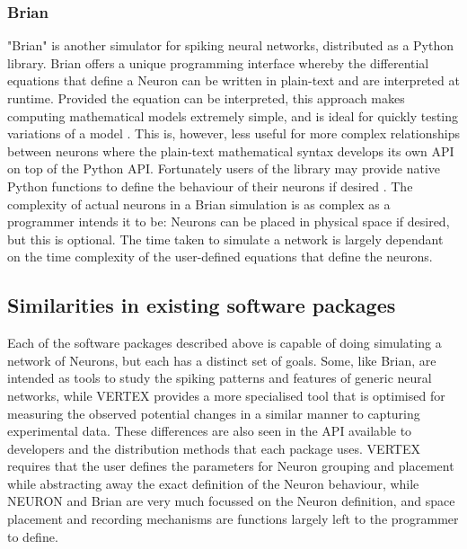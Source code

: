 \subsubsection{Brian}

"Brian" is another simulator for spiking neural networks, distributed as a
Python library. Brian offers a unique programming interface whereby the
differential equations that define a Neuron can be written in plain-text and are
interpreted at runtime. Provided the equation can be interpreted, this approach
makes computing mathematical models extremely simple, and is ideal for quickly
testing variations of a model \autocite{stimberg_brian_2019}. This is, however,
less useful for more complex relationships between neurons where the plain-text
mathematical syntax develops its own API on top of the Python API. Fortunately
users of the library may provide native Python functions to define the behaviour
of their neurons if desired \autocite{noauthor_functions_2020}. The complexity
of actual neurons in a Brian simulation is as complex as a programmer intends it
to be: Neurons can be placed in physical space if desired, but this is optional.
The time taken to simulate a network is largely dependant on the time complexity
of the user-defined equations that define the neurons.

\subsection{Similarities in existing software packages}

Each of the software packages described above is capable of doing simulating a
network of Neurons, but each has a distinct set of goals. Some, like Brian, are
intended as tools to study the spiking patterns and features of generic neural
networks, while VERTEX provides a more specialised tool that is optimised for
measuring the observed potential changes in a similar manner to capturing
experimental data. These differences are also seen in the API available to
developers
and the distribution methods that each package uses. VERTEX requires that the
user defines the parameters for Neuron grouping and placement while abstracting
away the exact definition of the Neuron behaviour, while NEURON and Brian are
very much focussed on the Neuron definition, and space placement and recording
mechanisms are functions largely left to the programmer to define.